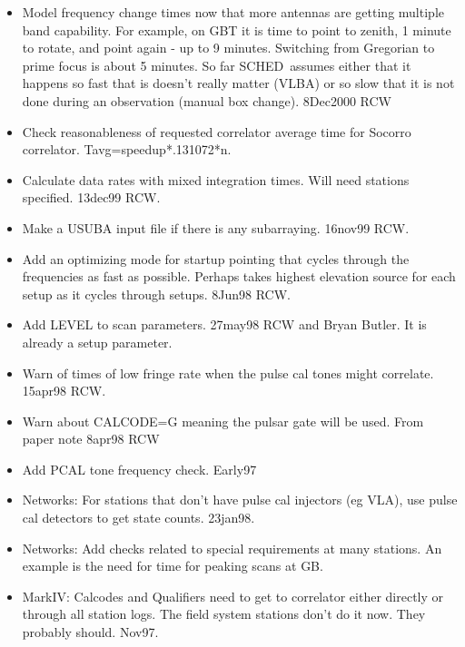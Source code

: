 \documentclass{report}
\newcommand{\schedb}{{\sc SCHED~}}
\begin{document}
\begin{itemize}
\item Model frequency change times now that more antennas are getting
      multiple band capability.  For example, on GBT it is time to
      point to zenith, 1 minute to rotate, and point again - up to
      9 minutes.  Switching from Gregorian to prime focus is about
      5 minutes.  So far \schedb assumes either that it happens so
      fast that is doesn't really matter (VLBA) or so slow that it
      is not done during an observation (manual box change).
      8Dec2000 RCW

\item Check reasonableness of requested correlator average time for
      Socorro correlator.  Tavg=speedup*.131072*n.

\item Calculate data rates with mixed integration times.  Will need
      stations specified.  13dec99 RCW.

\item Make a USUBA input file if there is any subarraying.
      16nov99 RCW.

\item Add an optimizing mode for startup pointing that cycles through
      the frequencies as fast as possible.  Perhaps takes highest
      elevation source for each setup as it cycles through setups.
      8Jun98 RCW.

\item Add LEVEL to scan parameters.  27may98 RCW and Bryan Butler.
      It is already a setup parameter.

\item Warn of times of low fringe rate when the pulse cal tones
      might correlate.  15apr98  RCW.

\item Warn about CALCODE=G meaning the pulsar gate will be used.
      From paper note  8apr98 RCW

\item Add PCAL tone frequency check.  Early97

\item Networks:  For stations that don't have pulse cal injectors (eg VLA),
      use pulse cal detectors to get state counts.  23jan98.

\item Networks:  Add checks related to special requirements at many stations.
      An example is the need for time for peaking scans at GB.

\item MarkIV:  Calcodes and Qualifiers need to get to correlator either
      directly or through all station logs.  The field system
      stations don't do it now.  They probably should.  Nov97.


\end{itemize}
\end{document}
